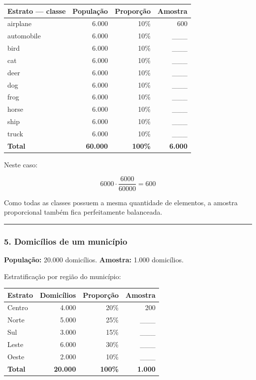 \documentclass[
]{book}
\begin{document}
\begin{longtable}[]{@{}lrrr@{}}
\toprule\noalign{}
Estrato --- classe & População & Proporção & Amostra \\
\midrule\noalign{}
\endhead
\bottomrule\noalign{}
\endlastfoot
airplane & 6.000 & 10\% & 600 \\
automobile & 6.000 & 10\% & \_\_\_ \\
bird & 6.000 & 10\% & \_\_\_ \\
cat & 6.000 & 10\% & \_\_\_ \\
deer & 6.000 & 10\% & \_\_\_ \\
dog & 6.000 & 10\% & \_\_\_ \\
frog & 6.000 & 10\% & \_\_\_ \\
horse & 6.000 & 10\% & \_\_\_ \\
ship & 6.000 & 10\% & \_\_\_ \\
truck & 6.000 & 10\% & \_\_\_ \\
\textbf{Total} & \textbf{60.000} & \textbf{100\%} & \textbf{6.000} \\
\end{longtable}

Neste caso:

\[
6000\cdot\frac{6000}{60000}=600
\]

Como todas as classes possuem a mesma quantidade de elementos, a amostra proporcional também fica perfeitamente balanceada.

\begin{center}\rule{0.5\linewidth}{0.5pt}\end{center}

\subsubsection{5. Domicílios de um município}\label{domicuxedlios-de-um-municuxedpio}

\textbf{População:} 20.000 domicílios.
\textbf{Amostra:} 1.000 domicílios.

Estratificação por região do município:

\begin{longtable}[]{@{}lrrr@{}}
\toprule\noalign{}
Estrato & Domicílios & Proporção & Amostra \\
\midrule\noalign{}
\endhead
\bottomrule\noalign{}
\endlastfoot
Centro & 4.000 & 20\% & 200 \\
Norte & 5.000 & 25\% & \_\_\_ \\
Sul & 3.000 & 15\% & \_\_\_ \\
Leste & 6.000 & 30\% & \_\_\_ \\
Oeste & 2.000 & 10\% & \_\_\_ \\
\textbf{Total} & \textbf{20.000} & \textbf{100\%} & \textbf{1.000} \\
\end{longtable}
\end{document}
